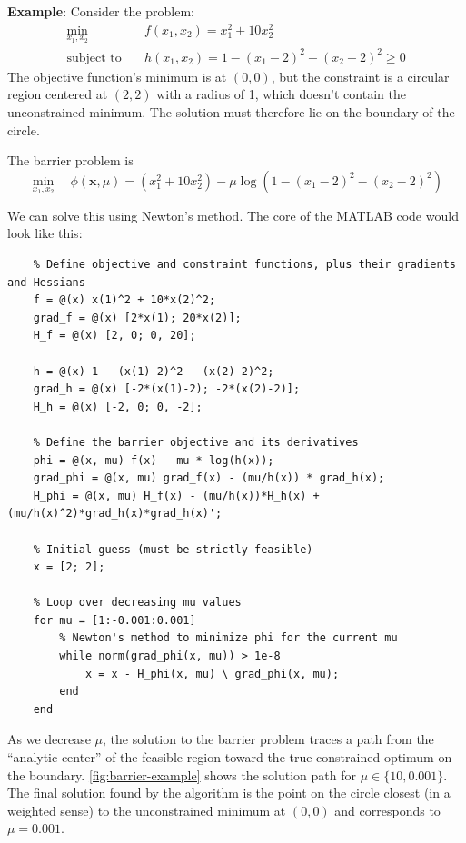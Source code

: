 \begin{exampleBox}
    \textbf{Example}:
    Consider the problem:
    \begin{equation}
    \begin{aligned}
    \min_{x_1, x_2} \quad & f(x_1, x_2) = x_1^2 + 10x_2^2 \\
    \text{subject to} \quad & h(x_1, x_2) = 1 - (x_1 - 2)^2 - (x_2 - 2)^2 \ge 0
    \end{aligned}
    \end{equation}
    The objective function's minimum is at $(0,0)$, but the constraint is a circular region centered at $(2,2)$ with a radius of 1, which doesn't contain the unconstrained minimum. The solution must therefore lie on the boundary of the circle.

    The barrier problem is
    \begin{equation}
    \min_{x_1, x_2} \quad \phi(\mathbf{x}, \mu) = (x_1^2 + 10x_2^2) - \mu \log\left(1 - (x_1 - 2)^2 - (x_2 - 2)^2\right)
    \label{eq:barrier-problem-example}
    \end{equation}

    We can solve this using Newton's method. The core of the MATLAB code would look like this:

    \begin{verbatim}
    % Define objective and constraint functions, plus their gradients and Hessians
    f = @(x) x(1)^2 + 10*x(2)^2;
    grad_f = @(x) [2*x(1); 20*x(2)];
    H_f = @(x) [2, 0; 0, 20];

    h = @(x) 1 - (x(1)-2)^2 - (x(2)-2)^2;
    grad_h = @(x) [-2*(x(1)-2); -2*(x(2)-2)];
    H_h = @(x) [-2, 0; 0, -2];

    % Define the barrier objective and its derivatives
    phi = @(x, mu) f(x) - mu * log(h(x));
    grad_phi = @(x, mu) grad_f(x) - (mu/h(x)) * grad_h(x);
    H_phi = @(x, mu) H_f(x) - (mu/h(x))*H_h(x) + (mu/h(x)^2)*grad_h(x)*grad_h(x)';

    % Initial guess (must be strictly feasible)
    x = [2; 2];

    % Loop over decreasing mu values
    for mu = [1:-0.001:0.001]
        % Newton's method to minimize phi for the current mu
        while norm(grad_phi(x, mu)) > 1e-8
            x = x - H_phi(x, mu) \ grad_phi(x, mu);
        end
    end
    \end{verbatim}

    As we decrease $\mu$, the solution to the barrier problem traces a path from the ``analytic center'' of the feasible region toward the true constrained optimum on the boundary. \autoref{fig:barrier-example} shows the solution path for $\mu\in\{10,0.001\}$. The final solution found by the algorithm is the point on the circle closest (in a weighted sense) to the unconstrained minimum at $(0,0)$ and corresponds to $\mu=0.001$.


\end{exampleBox}
